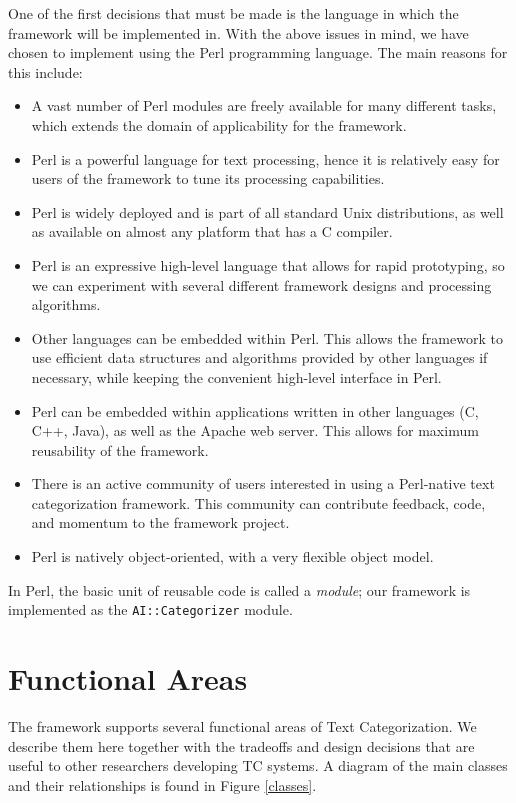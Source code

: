 \documentclass[a4paper,twocolumn]{article}
\begin{document}
One of the first decisions that must be made is the language in which the framework will be implemented in.  With the above issues in mind, we have chosen to implement using the Perl programming language. \cite{Wall:00}  The main reasons for this include:

\begin{itemize}
\item A vast number of Perl modules are freely available for many different tasks, which extends the domain of applicability for the framework.
\item Perl is a powerful language for text processing, hence it is relatively easy for users of the framework to tune its processing capabilities.
\item Perl is widely deployed and is part of all standard Unix distributions, as well as available on almost any platform that has a C compiler.
\item Perl is an expressive high-level language that allows for rapid prototyping, so we can experiment with several different framework designs and processing algorithms.
\item Other languages can be embedded within Perl.  This allows the framework to use efficient data structures and algorithms provided by other languages if necessary, while keeping the convenient high-level interface in Perl.
\item Perl can be embedded within applications written in other languages (C, C++, Java), as well as the Apache web server.  This allows for maximum reusability of the framework.
\item There is an active community of users interested in using a Perl-native text categorization framework.  This community can contribute feedback, code, and momentum to the framework project.
\item Perl is natively object-oriented, with a very flexible object model. \cite{conway:99}
\end{itemize}

In Perl, the basic unit of reusable code is called a \emph{module};
our framework is implemented as the \texttt{AI::Categorizer} module.

\section{Functional Areas}

The framework supports several functional areas of Text
Categorization. We describe them here together with the tradeoffs and
design decisions that are useful to other researchers developing TC
systems.  A diagram of the main classes and their relationships is 
found in Figure \ref{classes}.
\end{document}
